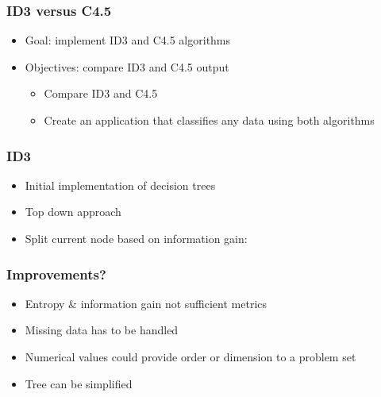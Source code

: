 \documentclass{beamer}
\begin{document}
\begin{frame}
\frametitle{ID3 versus C4.5}
	\begin{itemize}
		\item Goal: implement ID3 and C4.5 algorithms
		\vfill
		\item Objectives: compare ID3 and C4.5 output
		\vfill
		\begin{itemize}
			\item Compare ID3 and C4.5
			\vfill
			\item Create an application that classifies any data using both algorithms
		\end{itemize}

	\end{itemize}

\end{frame}

\begin{frame}
\frametitle{ID3}
\begin{itemize}
\item Initial implementation of decision trees
\item Top down approach
\item Split current node based on information gain:

\end{itemize}

\end{frame}
\begin{frame}
\frametitle{Improvements?}
\begin{itemize}
\item Entropy \& information gain not sufficient metrics
\vfill
\item Missing data has to be handled
\vfill
\item Numerical values could provide order or dimension to a problem set
\vfill
\item Tree can be simplified
\end{itemize}
\end{frame}
\end{document}
